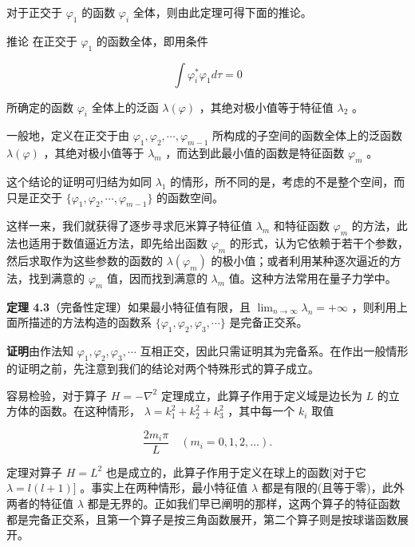 对于正交于 $\varphi_{1}$ 的函数 $\varphi_{i}$ 全体，则由此定理可得下面的推论。

推论 在正交于 $\varphi_{1}$ 的函数全体，即用条件

\begin{equation*}
\int \varphi_ {i} ^ {*} \varphi_ {1} d \tau = 0
\end{equation*}

所确定的函数 $\varphi_{i}$ 全体上的泛函 $\lambda(\varphi)$ ，其绝对极小值等于特征值 $\lambda_{2}$ 。

一般地，定义在正交于由 $\varphi_{1}, \varphi_{2}, \cdots, \varphi_{m-1}$ 所构成的子空间的函数全体上的泛函数 $\lambda(\varphi)$ ，其绝对极小值等于 $\lambda_{m}$ ，而达到此最小值的函数是特征函数 $\varphi_{m}$ 。

这个结论的证明可归结为如同 $\lambda_{1}$ 的情形，所不同的是，考虑的不是整个空间，而只是正交于 $\{\varphi_{1},\varphi_{2},\cdots,\varphi_{m-1}\}$ 的函数空间。

这样一来，我们就获得了逐步寻求厄米算子特征值 $\lambda_{m}$ 和特征函数 $\varphi_{m}$ 的方法，此法也适用于数值逼近方法，即先给出函数 $\varphi_{m}$ 的形式，认为它依赖于若干个参数，然后求取作为这些参数的函数的 $\lambda(\varphi_{m})$ 的极小值；或者利用某种逐次逼近的方法，找到满意的 $\varphi_{m}$ 值，因而找到满意的 $\lambda_{m}$ 值。这种方法常用在量子力学中。

\textbf{定理 4.3}\quad （完备性定理）如果最小特征值有限，且 $\lim_{n\to\infty}\lambda_{n}=+\infty$ ，则利用上面所描述的方法构造的函数系 $\{\varphi_{1},\varphi_{2},\varphi_{3},\cdots\}$ 是完备正交系。

\textbf{证明}\quad 由作法知 $\varphi_{1}, \varphi_{2}, \varphi_{3}, \cdots$ 互相正交，因此只需证明其为完备系。在作出一般情形的证明之前，先注意到我们的结论对两个特殊形式的算子成立。

容易检验，对于算子 $H = -\nabla^2$ 定理成立，此算子作用于定义域是边长为 $L$ 的立方体的函数。在这种情形， $\lambda = k_1^2 + k_2^2 + k_3^2$ ，其中每一个 $k_i$ 取值

\begin{equation*}
\frac {2 m _ {i} \pi}{L} \quad (m _ {i} = 0, 1, 2, \dots).
\end{equation*}

定理对算子 $H = L^2$ 也是成立的，此算子作用于定义在球上的函数[对于它 $\lambda = l(l + 1)]$ 。事实上在两种情形，最小特征值 $\lambda$ 都是有限的(且等于零)，此外两者的特征值 $\lambda$ 都是无界的。正如我们早已阐明的那样，这两个算子的特征函数都是完备正交系，且第一个算子是按三角函数展开，第二个算子则是按球谐函数展开。

